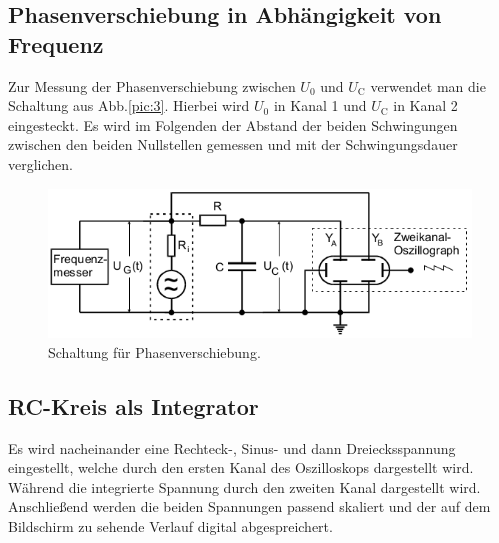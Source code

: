 \subsection{Phasenverschiebung in Abhängigkeit von Frequenz}
Zur Messung der Phasenverschiebung zwischen $U_0$ und $U_\text{C}$ verwendet man die Schaltung aus Abb.\ref{pic:3}.
Hierbei wird $U_0$ in Kanal 1 und $U_\text{C}$ in Kanal 2 eingesteckt.
Es wird im Folgenden der Abstand der beiden Schwingungen zwischen den beiden Nullstellen gemessen
und mit der Schwingungsdauer verglichen.

\begin{figure}[H]
  \centering
  \includegraphics{content/images/pic4.png}
  \caption{Schaltung für Phasenverschiebung.}
  \label{pic:4}
\end{figure}


\subsection{RC-Kreis als Integrator}
Es wird nacheinander eine Rechteck-, Sinus- und dann Dreiecksspannung eingestellt, welche durch den
ersten Kanal des Oszilloskops dargestellt wird. Während die integrierte Spannung durch den zweiten Kanal dargestellt wird.
Anschließend werden die beiden Spannungen passend skaliert und der auf dem Bildschirm zu sehende Verlauf
digital abgespreichert.
